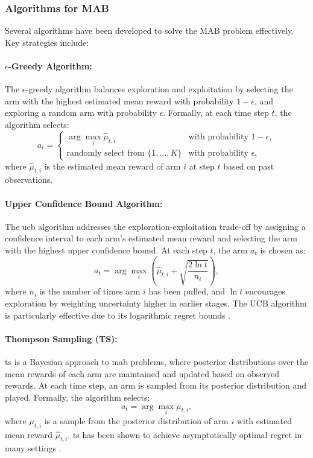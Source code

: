 \subsubsection{Algorithms for MAB}
Several algorithms have been developed to solve the MAB problem effectively. Key strategies include:

\paragraph{$\epsilon$-Greedy Algorithm:}
The $\epsilon$-greedy algorithm balances exploration and exploitation by selecting the arm with the highest estimated mean reward with probability $1 - \epsilon$, and exploring a random arm with probability $\epsilon$. Formally, at each time step $t$, the algorithm selects:
\begin{equation*}
    a_t =
    \begin{cases}
        \arg \max_{i} \hat{\mu}_{t,i} & \text{with probability } 1 - \epsilon, \\
        \text{randomly select from } \{1, \ldots, K\} & \text{with probability } \epsilon,
    \end{cases}
\end{equation*}
where $\hat{\mu}_{t,i}$ is the estimated mean reward of arm $i$ at step $t$ based on past observations.

\paragraph{Upper Confidence Bound Algorithm:}
The \ac{ucb} algorithm addresses the exploration-exploitation trade-off by assigning a confidence interval to each arm’s estimated mean reward and selecting the arm with the highest upper confidence bound. At each step $t$, the arm $a_t$ is chosen as:
\begin{equation*}
    a_t = \arg \max_i \left( \hat{\mu}_{t,i} + \sqrt{\frac{2 \ln t}{n_i}} \right),
\end{equation*}
where $n_i$ is the number of times arm $i$ has been pulled, and $\ln t$ encourages exploration by weighting uncertainty higher in earlier stages. The UCB algorithm is particularly effective due to its logarithmic regret bounds \citep{auer2002finite}.

\paragraph{Thompson Sampling (TS):}
\acf{ts} is a Bayesian approach to \ac{mab} problems, where posterior distributions over the mean rewards of each arm are maintained and updated based on observed rewards. At each time step, an arm is sampled from its posterior distribution and played. Formally, the algorithm selects:
\begin{equation*}
    a_t = \arg \max_i \bar{\mu}_{t,i},
\end{equation*}
where $\bar{\mu}_{t,i}$ is a sample from the posterior distribution of arm $i$ with estimated mean reward $\hat{\mu}_{t,i}$. \ac{ts} has been shown to achieve asymptotically optimal regret in many settings \citep{agrawal2012analysis}.

